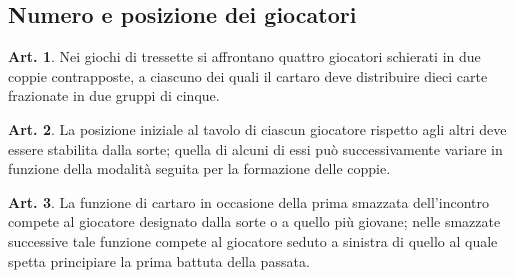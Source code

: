 \documentclass[italian,a4paper]{book}
\theoremstyle{definition}
\newtheorem{art}{Art.}
\begin{document}
\subsection{Numero e posizione dei giocatori}
\begin{art}
Nei giochi di tressette si affrontano quattro giocatori schierati in due
coppie contrapposte, a ciascuno dei quali il cartaro deve distribuire dieci carte frazionate in due gruppi di cinque.
\end{art}
\begin{art}
La posizione iniziale al tavolo di ciascun giocatore rispetto agli altri deve essere stabilita dalla sorte; quella di alcuni di essi può successivamente variare in funzione della modalità seguita per la formazione delle coppie.
\end{art}
\begin{art}
La funzione di cartaro in occasione della prima smazzata dell'incontro compete al giocatore designato dalla sorte o a quello più giovane; nelle smazzate successive tale funzione compete al giocatore seduto a sinistra di quello al quale spetta principiare la prima battuta della passata.
\end{art}
\end{document}
